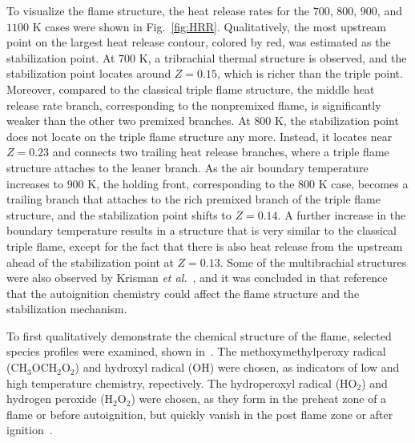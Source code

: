 \documentclass[review,3p,times]{elsarticleUS}
\begin{document}
To visualize the flame structure, the heat release rates for the $700$, $800$, $900$, and $1100$ K cases were shown in Fig.~\ref{fig:HRR}.  Qualitatively, the most upstream point on the largest heat release contour, colored by red, was estimated as the stabilization point.  At $700$ K, a tribrachial thermal structure is observed, and the stabilization point locates around $Z = 0.15$, which is richer than the triple point.  Moreover, compared to the classical triple flame structure, the middle heat release rate branch, corresponding to the nonpremixed flame, is significantly weaker than the other two premixed branches.  At $800$ K, the stabilization point does not locate on the triple flame structure any more.  Instead, it locates near $Z = 0.23$ and connects two trailing heat release branches, where a triple flame structure attaches to the leaner branch.  As the air boundary temperature increases to $900$ K, the holding front, corresponding to the $800$ K case, becomes a trailing branch that attaches to the rich premixed branch of the triple flame structure, and the stabilization point shifts to $Z = 0.14$.  A further increase in the boundary temperature results in a structure that is very similar to the classical triple flame, except for the fact that there is also heat release from the upstream ahead of the stabilization point at $Z = 0.13$.  Some of the multibrachial structures were also observed by Krisman \emph{et al.}~\cite{krisman14}, and it was concluded in that reference that the autoignition chemistry could affect the flame structure and the stabilization mechanism.  

To first qualitatively demonstrate the chemical structure of the flame, selected species profiles were examined, shown in~.  The methoxymethylperoxy radical (CH$_3$OCH$_2$O$_2$) and hydroxyl radical (OH) were chosen, as indicators of low and high temperature chemistry, repectively.  The hydroperoxyl radical (HO$_2$) and hydrogen peroxide (H$_2$O$_2$) were chosen, as they form in the preheat zone of a flame or before autoignition, but quickly vanish in the post flame zone or after ignition~\cite{yoo09}.  
\end{document}
